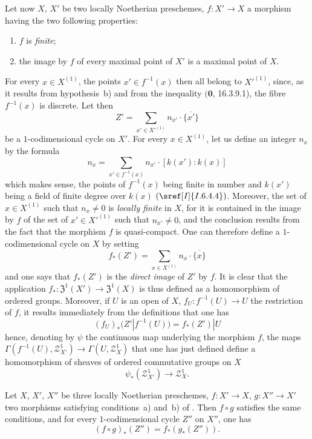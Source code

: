 
\begin{env}[21.10.14]
\label{IV.21.10.14}
Let now $X$, $X'$ be two locally Noetherian preschemes, $f:X'\to X$ a morphism having the two following properties:
\begin{enumerate}[label=\emph{\alph*)}]
  \item $f$ is \emph{finite};
  \item the image by $f$ of every maximal point of $X'$ is a maximal point of $X$.
\end{enumerate}
For every $x\in X^{(1)}$, the points $x'\in f^{-1}(x)$ then all belong to $X'^{(1)}$, since, as it results from hypothesis~b) and from the inequality $(\mathbf{0}$, 16.3.9.1), the fibre $f^{-1}(x)$ is discrete.
Let then
\[
  Z'=\sum_{x'\in X'^{(1)}}n_{x'}\cdot\overline{\{x'\}}
\]
be a $1$-codimensional cycle on $X'$.
For every $x\in X^{(1)}$, let us define an integer $n_x$ by the formula
\[
  n_x=\sum_{x'\in f^{-1}(x)}n_{x'}\cdot[k(x'):k(x)]
\]
which makes sense, the points of $f^{-1}(x)$ being finite in number and $k(x')$ being a field of finite degree over $k(x)$ $(\sref[I]{I.6.4.4})$.
Moreover, the set of $x\in X^{(1)}$ such that $n_x\neq 0$ is \emph{locally finite} in $X$, for it is contained in the image by $f$ of the set of $x'\in X'^{(1)}$ such that $n_{x'}\neq 0$, and the conclusion results from the fact that the morphism $f$ is quasi-compact.
One can therefore define a $1$-codimensional cycle on $X$ by setting
\[
\label{IV.21.10.14.1}
  f_*(Z')=\sum_{x\in X^{(1)}}n_x\cdot\overline{\{x\}}
  \tag{21.10.14.1}
\]
and one says that $f_*(Z')$ is the \emph{direct image} of $Z'$ by $f$.
It is clear that the application $f_*:\mathfrak{Z}^1(X')\to\mathfrak{Z}^1(X)$ is thus defined as a homomorphism of ordered groups.
Moreover, if $U$ is an open of $X$, $f_U:f^{-1}(U)\to U$ the restriction of $f$, it results immediately from the definitions that one has
\[
\label{IV.21.10.14.2}
  (f_U)_*(Z'|f^{-1}(U))=f_*(Z')|U
  \tag{21.10.14.2}
\]
hence, denoting by $\psi$ the continuous map underlying the morphism $f$, the maps $\Gamma(f^{-1}(U),\mathscr{Z}_{X'}^1)\to\Gamma(U,\mathscr{Z}_X^1)$ that one has just defined define a homomorphism of sheaves of ordered commutative groups on $X$
\[
  \psi_*(\mathscr{Z}_{X'}^1)\to\mathscr{Z}_X^1.
\]
\end{env}


\begin{proposition}[21.10.15]
\label{IV.21.10.15}
Let $X$, $X'$, $X''$ be three locally Noetherian preschemes, $f:X'\to X$, $g:X''\to X'$ two morphisms satisfying conditions~a) and~b) of .
Then $f\circ g$ satisfies the same conditions, and for every $1$-codimensional cycle $Z''$ on $X''$, one has
\[
  (f\circ g)_*(Z'')=f_*(g_*(Z'')).
\]
\end{proposition}

